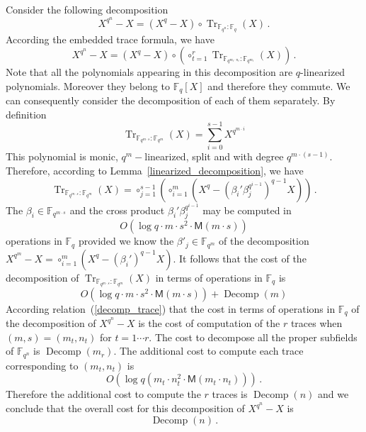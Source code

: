 \documentclass{sig-alternate}
\newcommand{\ff}[1]{\mathbb{F}_{#1}}
\newcommand{\qq}{q}
\newcommand{\nn}{n}
\newcommand{\qn}{{\qq^\nn}}
\newcommand{\basef}{\ff{\qq}}
\newcommand{\extf}{\ff{\qn}}
\DeclareMathOperator{\Tr}{Tr}
\DeclareMathOperator{\Decomp}{Decomp}
\newcommand{\tr}[2]{\Tr_{\ff{#1}:\ff{#2}}}
\newcommand{\bigO}{O}
\newcommand{\Mul}{\mathsf{M}}
\begin{document}
\noindent Consider the following decomposition
$$X^{\qq^{\nn}}-X=(X^{\qq}-X) \circ   \tr{\qq^\nn}{\qq}(X)  \,.  $$
According the embedded trace formula, we have
 \begin{equation}
 \label{decomp_trace}
 X^{\qq^{\nn}}-X=(X^{\qq}-X) \circ \left( \circ_{t=1}^r  \tr{\qq^{m_t \cdot n_t}}{\qq^{m_{t}}}(X) \right)     \,. 
\end{equation}
Note that all the polynomials appearing in this decomposition are $q$-linearized polynomials. Moreover they belong to $\basef[X]$ and therefore they commute.
 We can consequently consider the decomposition of each of them separately. By definition
 $$  \tr{\qq^{m \cdot s}}{\qq^{m}}(X) =\sum_{i=0}^{s-1} X^{\qq^{m\cdot i}}  $$
This polynomial is monic, $\qq^{m}-$linearized, split and with degree $\qq^{m \cdot (s-1)}$. Therefore, according to Lemma~\ref{linearized_decomposition}, we have
\begin{equation}
\label{decomposition_trace}
\tr{\qq^{m \cdot s}}{\qq^{m}}(X)=\circ_{j=1}^{s-1} \left( \circ_{i=1}^{m} (X^\qq-(\beta_i'  \beta_j^{\qq^{i-1}})^{q-1}   X) \right)\,.
\end{equation}
The $\beta_i \in \mathbb{F}_{\qq^{m \cdot s}}$ and the cross product $\beta_i'  \beta_j^{\qq^{i-1}}$ may be computed in 
$$\bigO(\log q \cdot m \cdot s^2 \cdot \Mul(m \cdot s))$$
operations in $\basef$ provided we know the $\beta'_j \in \mathbb{F}_{\qq^m}$ of the decomposition $X^{\qq^{m}}-X=\circ_{i=1}^{m} (X^{\qq}-(\beta_i')^{\qq-1} X)$.
It follows that the cost of the decomposition of $\tr{\qq^{m \cdot s}}{\qq^{m}}(X)$ in terms of operations in $\basef$ is
\begin{equation}
\label{recursive_complexity_trace}
\bigO(\log q \cdot m \cdot s^2 \cdot \Mul(m \cdot s)) +\Decomp(m)
\end{equation}
According relation~(\ref{decomp_trace}) that the cost in terms of operations in $\basef$ of the decomposition of $X^{\qq^\nn}-X$ is the cost of computation of the $r$ traces when $(m,s)=(m_{t},n_t)$ for $t=1 \cdots r$. The cost to decompose all the proper subfields of $\extf$ is $\Decomp(m_r)$. The additional cost to compute each trace corresponding to $(m_t,n_t)$ is 
$$\bigO\left(\log q \left(m_t \cdot n_t^2 \cdot \Mul(m_t \cdot n_t) \right) \right)\,.$$
Therefore the additional cost to compute the $r$ traces is $\Decomp(\nn)$ and we conclude that the overall cost for this decomposition of $X^{\qq^\nn}-X$ is 
$$\Decomp(\nn)\,.$$
\end{document}
